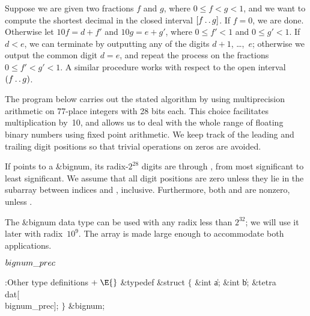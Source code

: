 Suppose we are given two fractions $f$ and $g$, where $0\le f<g<1$, and
we want to compute the shortest decimal in the closed interval $[f\mathinner{\ldotp\ldotp} g]$.
If $f=0$, we are done. Otherwise let $10f=d+f'$ and $10g=e+g'$, where
$0\le f'<1$ and $0\le g'<1$. If $d<e$, we can terminate by outputting
any of the digits $d+1$, \dots,~$e$; otherwise we output the
common digit $d=e$, and repeat the process on the fractions $0\le f'<g'<1$.
A similar procedure works with respect to the open interval $(f\mathinner{\ldotp\ldotp} g)$.

\fi

The program below carries out the stated algorithm by using
multiprecision
arithmetic on 77-place integers with 28 bits each. This choice
facilitates multiplication by~10, and allows us to deal with the whole range of
floating binary numbers using fixed point arithmetic. We keep track of
the leading and trailing digit positions so that trivial operations on
zeros are avoided.

If  points to a \&{bignum}, its radix-$2^{28}$ digits are
 through , from most
significant to least significant.
We assume that all digit positions are zero unless they lie in the
subarray between indices  and , inclusive.
Furthermore, both  and  are nonzero,
unless .

The \&{bignum} data type can be used with any radix less than
$2^{32}$; we will use it later with radix~$10^9$. The  array
is made large enough to accommodate both applications.

\Y\B\4\D$\\{bignum\_prec}$ \5
\par
\Y\B\4:Other type definitions\X${}\mathrel+\E{}$\6
\&{typedef} \&{struct} ${}\{{}$\1\6
\&{int} \|a;\6
\&{int} \|b;\6
\&{tetra} \\{dat}[\\{bignum\_prec}];\2\6
${}\}{}$ \&{bignum};\par
\fi

